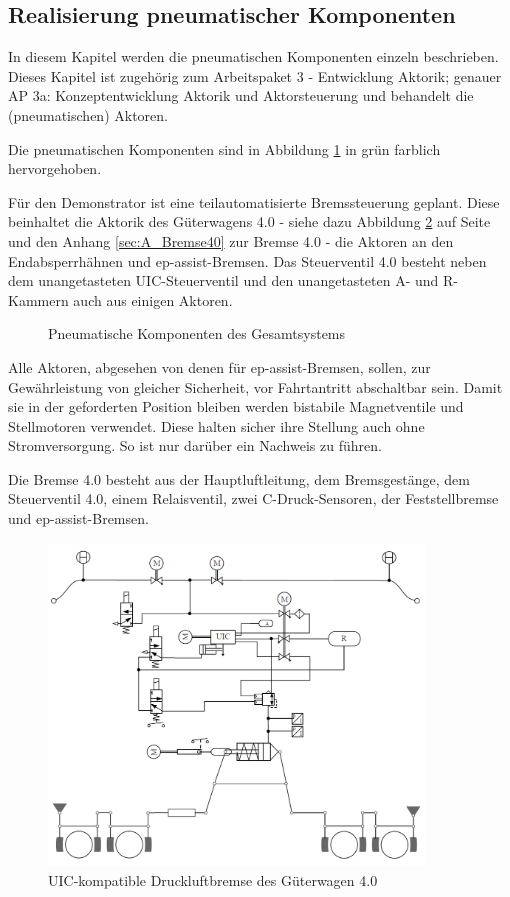 \subsection{Realisierung pneumatischer Komponenten}
In diesem Kapitel werden die pneumatischen Komponenten einzeln beschrieben. Dieses Kapitel ist zugehörig zum Arbeitspaket 3 - Entwicklung Aktorik; genauer AP 3a: Konzeptentwicklung Aktorik und Aktorsteuerung und behandelt die (pneumatischen) Aktoren.\par
Die pneumatischen Komponenten sind in Abbildung \ref{fig:pKomp} in grün farblich hervorgehoben.\par
Für den Demonstrator ist eine teilautomatisierte Bremssteuerung geplant. Diese beinhaltet die Aktorik des Güterwagens 4.0 - siehe dazu Abbildung \ref{fig:UIC-Bremse} auf Seite \pageref{fig:UIC-Bremse} und den Anhang \ref{sec:A_Bremse40} zur Bremse 4.0 - die Aktoren an den Endabsperrhähnen und \gls{ep-assist-Bremsen}. Das Steuerventil 4.0 besteht neben dem unangetasteten UIC-Steuerventil und den unangetasteten A- und R-Kammern auch aus einigen Aktoren.\par
\begin{figure}[hbt]
    \centering
    
    \caption{Pneumatische Komponenten des Gesamtsystems}
    \label{fig:pKomp}
\end{figure}
Alle Aktoren, abgesehen von denen für \gls{ep-assist-Bremsen}, sollen, zur Gewährleistung von gleicher Sicherheit, vor Fahrtantritt abschaltbar sein. Damit sie in der geforderten Position bleiben werden bistabile Magnetventile und Stellmotoren verwendet. Diese halten sicher ihre Stellung auch ohne Stromversorgung. So ist nur darüber ein Nachweis zu führen.\par
Die Bremse 4.0 besteht aus der Hauptluftleitung, dem Bremsgestänge, dem Steuerventil 4.0, einem Relaisventil, zwei C-Druck-Sensoren, der Feststellbremse und \gls{ep-assist-Bremsen}.\par
\begin{figure}
    \centering%
    \includegraphics[width=10cm]{Bilder/GW40Schema.PNG}
    \caption{UIC-kompatible Druckluftbremse des Güterwagen 4.0}%
    \label{fig:UIC-Bremse}
\end{figure}
